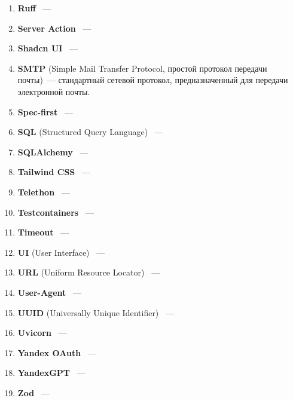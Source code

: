 \begin{enumerate}
    \item \textbf{Ruff} ~--- 
    
    \item \textbf{Server Action} ~--- 
    
    \item \textbf{Shadcn UI} ~--- 
    
    \item \textbf{SMTP} (Simple Mail Transfer Protocol, простой протокол передачи почты)~--- стандартный сетевой протокол, предназначенный для передачи электронной почты\cite{smtp_def}. 
    
    \item \textbf{Spec-first} ~--- 
    
    \item \textbf{SQL} (Structured Query Language) ~--- 
    
    \item \textbf{SQLAlchemy} ~--- 
    
    \item \textbf{Tailwind CSS} ~--- 
    
    \item \textbf{Telethon} ~--- 
    
    \item \textbf{Testcontainers} ~--- 
    
    \item \textbf{Timeout} ~--- 
    
    \item \textbf{UI} (User Interface) ~--- 
    
    \item \textbf{URL} (Uniform Resource Locator) ~--- 
    
    \item \textbf{User-Agent} ~--- 
    
    \item \textbf{UUID} (Universally Unique Identifier) ~--- 
    
    \item \textbf{Uvicorn} ~--- 
    
    \item \textbf{Yandex OAuth} ~--- 
    
    \item \textbf{YandexGPT} ~--- 
    
    \item \textbf{Zod} ~--- 

\end{enumerate}
